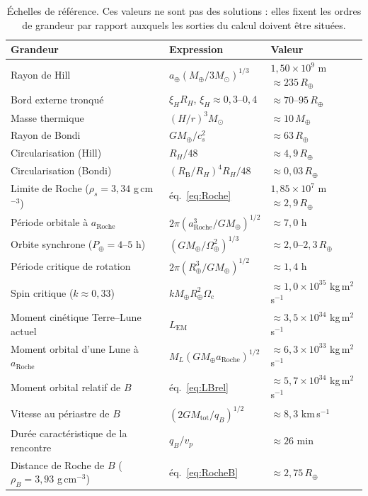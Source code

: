 \documentclass[11pt,a4paper,openany]{report}
\newcommand{\Mt}{M_{\oplus}}
\newcommand{\Rt}{R_{\oplus}}
\newcommand{\aR}{a_{\mathrm{Roche}}}
\newcommand{\Mtot}{M_{\mathrm{tot}}}
\begin{document}
\begin{table}[htbp]
\centering
\small
\caption{Échelles de référence. Ces valeurs ne sont pas des solutions : elles fixent les ordres de
grandeur par rapport auxquels les sorties du calcul doivent être situées.}
\label{tab:echelles}
\begin{tabular}{lll}
\toprule
\textbf{Grandeur} & \textbf{Expression} & \textbf{Valeur} \\
\midrule
Rayon de Hill & $a_\oplus(\Mt/3M_\odot)^{1/3}$ & $1{,}50\times10^{9}$ m $\approx235\,\Rt$ \\
Bord externe tronqué & $\xi_H R_H$, $\xi_H\approx0{,}3$--$0{,}4$ & $\approx70$--$95\,\Rt$ \\
Masse thermique & $(H/r)^3M_\odot$ & $\approx10\,\Mt$ \\
Rayon de Bondi & $G\Mt/c_s^2$ & $\approx63\,\Rt$ \\
Circularisation (Hill) & $R_H/48$ & $\approx4{,}9\,\Rt$ \\
Circularisation (Bondi) & $(R_{\mathrm{B}}/R_H)^4R_H/48$ & $\approx0{,}03\,\Rt$ \\
Limite de Roche ($\rho_s=3{,}34$ g\,cm$^{-3}$) & éq.~\eqref{eq:Roche} & $1{,}85\times10^{7}$ m $\approx2{,}9\,\Rt$ \\
Période orbitale à $\aR$ & $2\pi(\aR^3/G\Mt)^{1/2}$ & $\approx7{,}0$ h \\
Orbite synchrone ($P_\oplus=4$--$5$ h) & $(G\Mt/\Omega_\oplus^2)^{1/3}$ & $\approx2{,}0$--$2{,}3\,\Rt$ \\
Période critique de rotation & $2\pi(\Rt^3/G\Mt)^{1/2}$ & $\approx1{,}4$ h \\
Spin critique ($k\approx0{,}33$) & $k\Mt\Rt^2\Omega_{\mathrm{c}}$ & $\approx1{,}0\times10^{35}$ kg\,m$^2$\,s$^{-1}$ \\
Moment cinétique Terre--Lune actuel & $L_{\mathrm{EM}}$ & $\approx3{,}5\times10^{34}$ kg\,m$^2$\,s$^{-1}$ \\
Moment orbital d'une Lune à $\aR$ & $M_L(G\Mt\aR)^{1/2}$ & $\approx6{,}3\times10^{33}$ kg\,m$^2$\,s$^{-1}$ \\
Moment orbital relatif de $B$ & éq.~\eqref{eq:LBrel} & $\approx5{,}7\times10^{34}$ kg\,m$^2$\,s$^{-1}$ \\
Vitesse au périastre de $B$ & $(2G\Mtot/q_B)^{1/2}$ & $\approx8{,}3$ km\,s$^{-1}$ \\
Durée caractéristique de la rencontre & $q_B/v_p$ & $\approx26$ min \\
Distance de Roche de $B$ ($\rho_B=3{,}93$ g\,cm$^{-3}$) & éq.~\eqref{eq:RocheB} & $\approx2{,}75\,\Rt$ \\
\bottomrule
\end{tabular}
\end{table}
\end{document}
